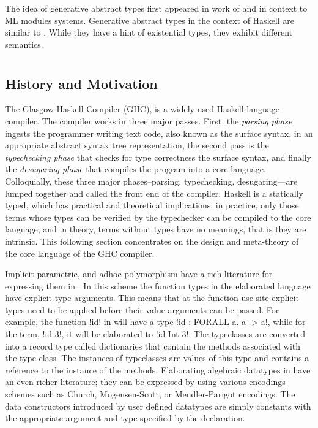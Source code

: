 \documentclass[screen,nonacm]{acmart}
\begin{document}
The idea of generative abstract types first appeared in work of
\citet{leroy_applicative_1995} and \citet{milner_definition_1997}
in context to ML modules systems. Generative abstract types in the
context of Haskell are similar to \cite{montagu_modeling_2009}.
While they have a hint of existential types, they exhibit different
semantics.

\section{\SFC}\label{sec:sfc} %
\subsection{History and Motivation}
The Glasgow Haskell Compiler (GHC)\cite{ghc_2020}, is a widely used
Haskell language\cite{haskell_2010} compiler. The compiler works in
three major passes. First, the \emph{parsing phase} ingests the
programmer writing text code, also known as
the surface syntax, in an appropriate abstract syntax tree
representation, the second pass is the \emph{typechecking phase} that
checks for type correctness the surface syntax, and finally the
\emph{desugaring phase} that compiles the program into a core
language. Colloquially, these three major phases--parsing,
typechecking, desugaring---are lumped together and called
the front end of the compiler. Haskell is a statically typed,
which has practical and theoretical implications;
in practice, only those terms whose types can be verified by the
typechecker can be compiled to the core language, and in theory,
terms without types have no meanings, that is they are intrinsic.
This following section concentrates on the design and meta-theory of
the core language of the GHC compiler.

Implicit parametric\cite{reynolds_user-defined_1978}, and adhoc
polymorphism\cite{hall_type_1994} have a rich literature for
expressing them in \SF. In this scheme the function types in the
elaborated language have explicit type arguments. This means that at
the function use site explicit types need to be applied before their
value arguments can be passed. For example, the function !id! in \SF
will have a type !id : FORALL a. a -> a!, while for the term, !id 3!,
it will be elaborated to !id Int 3!. The typeclasses are converted
into a record type called dictionaries that contain the
methods associated with the type class. The instances of typeclasses
are values of this type and contains a reference to the instance of
the methods. Elaborating algebraic datatypes in \SF have an even
richer literature; they can be expressed by using various encodings
schemes such as Church\cite{jansen_efficient_2005,jansen_programming_2013},
Mogensen-Scott\cite{mogensen_efficient_1992},
or Mendler-Parigot encodings\cite{parigot_representation_1990,
  stump_efficiency_2016}. The data constructors introduced by user
defined datatypes are simply constants with the appropriate argument
and type specified by the declaration.
\end{document}
